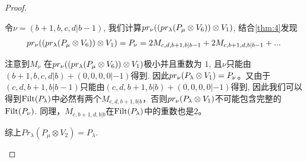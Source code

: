 \begin{proof}
\begin{enumerate}
\begin{enumerate}
\begin{enumerate}
令$\nu = (b+1,b,c,d|b-1)$, 我们计算$pr_\nu ( ( pr_\lambda(P_\mu \otimes V_{6}) ) \otimes V_1 )$, 结合\cref{thm:4}发现
\begin{equation}\notag
  \begin{aligned}
  pr_\nu ( ( pr_\lambda(P_\mu \otimes V_{6}) ) \otimes V_1 ) =
  P_\nu = 2M_{c,d,b+1,b|b-1} + 2M_{c,b+1,d,b|b-1} + ...
  \end{aligned}
\end{equation}

注意到$M_\nu$ 在$pr_\nu ( ( pr_\lambda(P_\mu \otimes V_{6}) ) \otimes V_1 )$极小并且重数为 $1$, 且$\nu$只能由$ (b+1,b,c,d|b) + (0,0,0,0|-1)$得到. 因此$pr_\nu(P_\lambda \otimes V_1) = P_\nu$。又由于$(c,d,b+1,b|b-1)$只能由$(c,d,b+1,b|b) + (0,0,0,0|-1)$得到, 因此我们可以得到$\operatorname{Filt}(P_{\lambda})$中必然有两个$M_{c,d,b+1,b|b}$，否则$pr_\nu(P_\lambda \otimes V_1)$不可能包含完整的$\operatorname{Filt}(P_\nu)$. 同理，$M_{c,b+1,d,b|b}$在$\operatorname{Filt}(P_{\lambda})$中的重数也是$2$。

综上$Pr_{\lambda}(P_\mu \otimes V_{2}) = P_\lambda  $.


\end{enumerate}
\end{enumerate}
\end{enumerate}
\end{proof}
